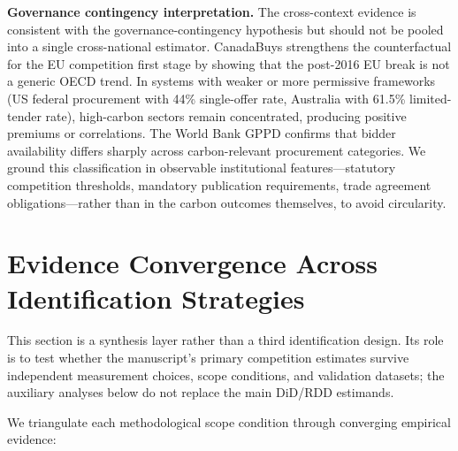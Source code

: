 \documentclass[11pt]{article}
\begin{document}
\textbf{Governance contingency interpretation.} The cross-context evidence is consistent with the governance-contingency hypothesis but should not be pooled into a single cross-national estimator. CanadaBuys strengthens the counterfactual for the EU competition first stage by showing that the post-2016 EU break is not a generic OECD trend. In systems with weaker or more permissive frameworks (US federal procurement with 44\% single-offer rate, Australia with 61.5\% limited-tender rate), high-carbon sectors remain concentrated, producing positive premiums or correlations. The World Bank GPPD confirms that bidder availability differs sharply across carbon-relevant procurement categories. We ground this classification in observable institutional features---statutory competition thresholds, mandatory publication requirements, trade agreement obligations---rather than in the carbon outcomes themselves, to avoid circularity.

\section{Evidence Convergence Across Identification Strategies}

This section is a synthesis layer rather than a third identification design. Its role is to test whether the manuscript's primary competition estimates survive independent measurement choices, scope conditions, and validation datasets; the auxiliary analyses below do not replace the main DiD/RDD estimands.

We triangulate each methodological scope condition through converging empirical evidence:
\end{document}
